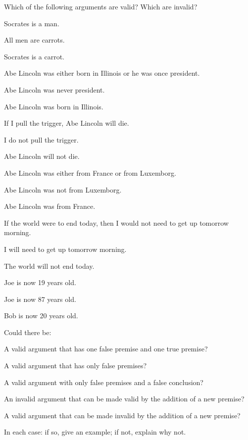 \practiceproblems
\problempart
Which of the following arguments are valid? Which are invalid?

\begin{earg}
\item Socrates is a man.
\item All men are carrots.
\item[\therefore] Socrates is a carrot.
\end{earg}

\begin{earg}
\item Abe Lincoln was either born in Illinois or he was once president.
\item Abe Lincoln was never president.
\item[\therefore] Abe Lincoln was born in Illinois.
\end{earg}

\begin{earg}
\item If I pull the trigger, Abe Lincoln will die.
\item I do not pull the trigger.
\item[\therefore] Abe Lincoln will not die.
\end{earg}

\begin{earg}
\item Abe Lincoln was either from France or from Luxemborg.
\item Abe Lincoln was not from Luxemborg.
\item[\therefore] Abe Lincoln was from France.
\end{earg}

\begin{earg}
\item If the world were to end today, then I would not need to get up tomorrow morning.
\item I will need to get up tomorrow morning.
\item[\therefore] The world will not end today.
\end{earg}

\begin{earg}
\item Joe is now 19 years old.
\item Joe is now 87 years old.
\item[\therefore] Bob is now 20 years old.
\end{earg}

\problempart
\label{pr.EnglishCombinations}
Could there be:
	\begin{earg}
		\item A valid argument that has one false premise and one true premise?
		\item A valid argument that has only false premises?
		\item A valid argument with only false premises and a false conclusion?
		\item An invalid argument that can be made valid by the addition of a new premise?
		\item A valid argument that can be made invalid by the addition of a new premise?
	\end{earg}
In each case: if so, give an example; if not, explain why not.


